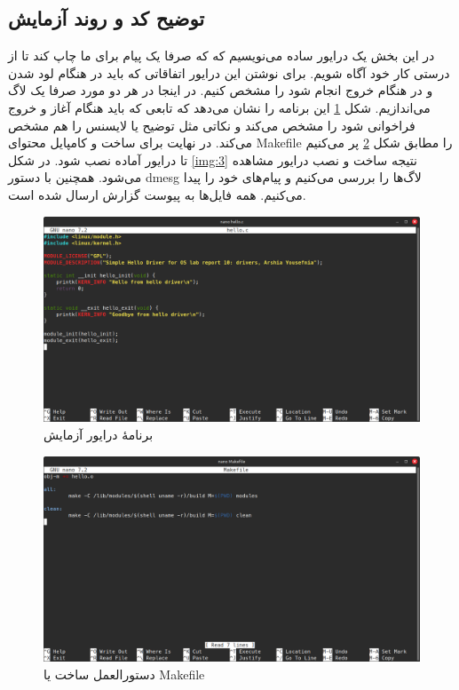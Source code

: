 \documentclass[12pt]{article}
\begin{document}
	\subsection{توضیح کد و روند آزمایش}
	در این بخش یک درایور ساده می‌نویسیم که که صرفا یک پیام برای ما چاپ کند تا از درستی کار خود آگاه شویم. برای نوشتن این درایور اتفاقاتی که باید در هنگام لود شدن و در هنگام خروج انجام شود را مشخص کنیم. در اینجا در هر دو مورد صرفا یک لاگ می‌اندازیم. شکل \ref{img:1} این برنامه را نشان می‌دهد که تابعی که باید هنگام آغاز و خروج فراخوانی شود را مشخص می‌کند و نکاتی مثل توضیح یا لایسنس را هم مشخص می‌کند. در نهایت برای ساخت و کامپایل محتوای \textenglish{Makefile} را مطابق شکل \ref{img:2} پر می‌کنیم تا درایور آماده نصب شود. در شکل \ref{img:3} نتیجه ساخت و نصب درایور مشاهده می‌شود. همچنین با دستور \textenglish{dmesg} لاگ‌ها را بررسی می‌کنیم و پیام‌های خود را پیدا می‌کنیم. همه فایل‌ها به پیوست گزارش ارسال شده است.
	\begin{figure}[H]
		\centering
		\includegraphics[width=\textwidth]{report10-resources/screenshots/1.png}
		\caption{برنامهٔ درایور آزمایش}
		\label{img:1}
	\end{figure}
	\begin{figure}[H]
		\centering
		\includegraphics[width=\textwidth]{report10-resources/screenshots/2.png}
		\caption{دستورالعمل ساخت یا \textenglish{Makefile}}
		\label{img:2}
	\end{figure}
\end{document}
